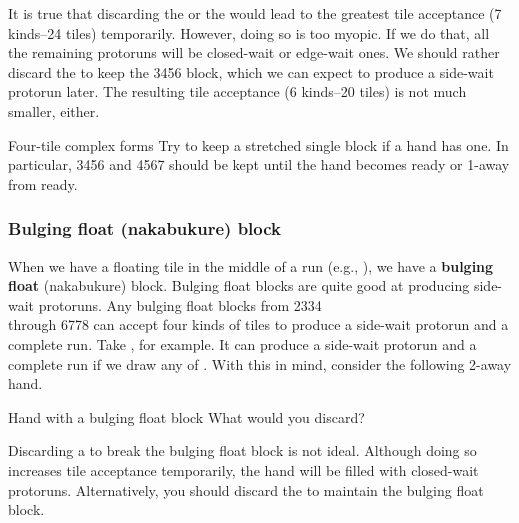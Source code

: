\bigskip 
\noindent
It is true that discarding the {\large{}} or the {\large{}} would lead to the greatest tile acceptance (7 kinds--24 tiles) temporarily. However, doing so is too myopic. If we do that, all the remaining protoruns will be closed-wait or edge-wait ones. We should rather discard the {\large{}} to keep the 3456 block, which we can expect to produce a side-wait protorun later. The resulting tile acceptance (6 kinds--20 tiles) is not much smaller, either. 

\bigskip

\begin{itembox}[c]{Four-tile complex forms}
Try to keep a stretched single block if a hand has one. In particular, 3456 and 4567 should be kept until the hand becomes ready or 1-away from ready. 
\end{itembox}

\bigskip


\subsubsection{Bulging float ({\jap nakabukure}) block}

When we have a floating tile in the middle of a run (e.g., {\large{}}), we have a {\bf bulging float} ({\jap nakabukure}) block. 
Bulging float blocks are quite good at producing side-wait protoruns. Any bulging float blocks from 2334 \\through 6778 can accept four kinds of tiles to produce a side-wait protorun and a complete run. Take {\large{}}, for example. It can produce a side-wait protorun and a complete run if we draw any of {\large{}}. 
With this in mind, consider the following 2-away hand.
\bigskip
\begin{itembox}[r]{Hand with a bulging float block}
\bp
{}
\ep
\vspace{-10pt}What would you discard? \vspace{-5pt}
\end{itembox}
Discarding a {\large{}} to break the bulging float block is not ideal. Although doing so increases tile acceptance temporarily, the hand will be filled with closed-wait protoruns. Alternatively, you should discard the {\large{}} to maintain the bulging float block. 

